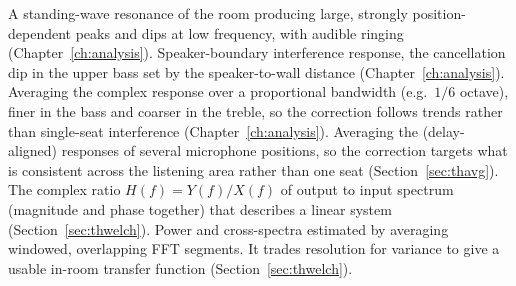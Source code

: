 \begin{description}[style=nextline, leftmargin=0pt, font=\normalfont\bfseries]
   A standing-wave resonance of the room producing large, strongly position-dependent peaks and dips at low frequency, with audible ringing (Chapter~\ref{ch:analysis}).
   Speaker-boundary interference response, the cancellation dip in the upper bass set by the speaker-to-wall distance (Chapter~\ref{ch:analysis}).
   Averaging the complex response over a proportional bandwidth (e.g.\ $1/6$ octave), finer in the bass and coarser in the treble, so the correction follows trends rather than single-seat interference (Chapter~\ref{ch:analysis}).
   Averaging the (delay-aligned) responses of several microphone positions, so the correction targets what is consistent across the listening area rather than one seat (Section~\ref{sec:thavg}).
   The complex ratio $H(f)=Y(f)/X(f)$ of output to input spectrum (magnitude and phase together) that describes a linear system (Section~\ref{sec:thwelch}).
   Power and cross-spectra estimated by averaging windowed, overlapping FFT segments. It trades resolution for variance to give a usable in-room transfer function (Section~\ref{sec:thwelch}).
\end{description}
